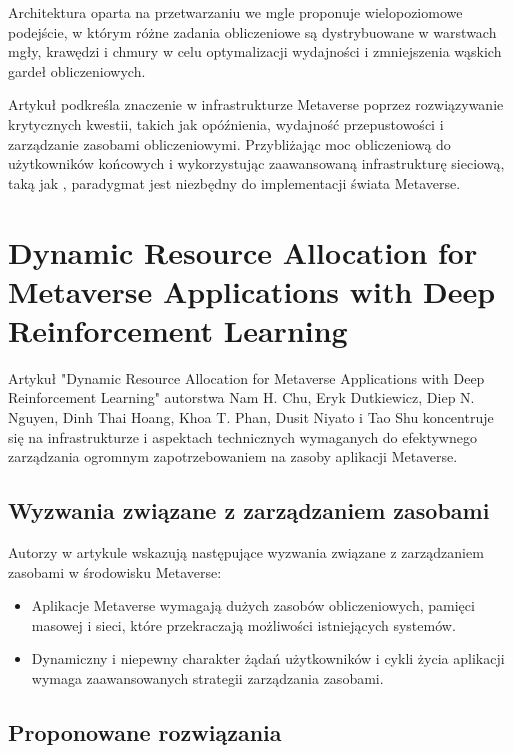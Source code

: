 \newpage
Architektura oparta na przetwarzaniu we mgle proponuje wielopoziomowe podejście, w którym różne zadania obliczeniowe są dystrybuowane w warstwach mgły, krawędzi i chmury w celu optymalizacji wydajności i zmniejszenia wąskich gardeł obliczeniowych.

Artykuł podkreśla znaczenie  w infrastrukturze Metaverse poprzez rozwiązywanie krytycznych kwestii, takich jak opóźnienia, wydajność przepustowości i zarządzanie zasobami obliczeniowymi. Przybliżając moc obliczeniową do użytkowników końcowych i wykorzystując zaawansowaną infrastrukturę sieciową, taką jak , paradygmat  jest niezbędny do implementacji świata Metaverse.

\section{Dynamic Resource Allocation for Metaverse Applications with Deep Reinforcement Learning}

Artykuł "Dynamic Resource Allocation for Metaverse Applications with Deep Reinforcement Learning" autorstwa Nam H. Chu,
Eryk Dutkiewicz, Diep N. Nguyen, Dinh Thai Hoang, Khoa T. Phan, Dusit Niyato i Tao Shu koncentruje się na infrastrukturze i aspektach technicznych wymaganych do efektywnego zarządzania ogromnym zapotrzebowaniem na zasoby aplikacji Metaverse.

\subsection{Wyzwania związane z zarządzaniem zasobami}

Autorzy w artykule wskazują następujące wyzwania związane z zarządzaniem zasobami w środowisku Metaverse:

\begin{itemize}
    \item Aplikacje Metaverse wymagają dużych zasobów obliczeniowych, pamięci masowej i sieci, które przekraczają możliwości istniejących systemów.
    \item Dynamiczny i niepewny charakter żądań użytkowników i cykli życia aplikacji wymaga zaawansowanych strategii zarządzania zasobami.
\end{itemize}

\subsection{Proponowane rozwiązania}

